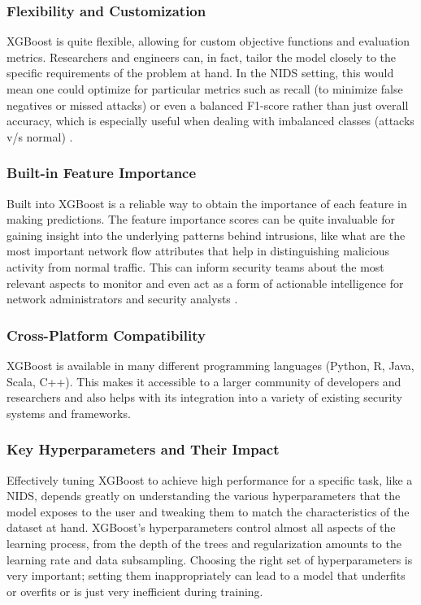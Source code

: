 \subsubsection{Flexibility and Customization} 
XGBoost is quite flexible, allowing for custom objective functions and evaluation metrics. Researchers and engineers can, in fact, tailor the model closely to the specific requirements of the problem at hand. In the NIDS setting, this would mean one could optimize for particular metrics such as recall (to minimize false negatives or missed attacks) or even a balanced F1-score rather than just overall accuracy, which is especially useful when dealing with imbalanced classes (attacks v/s normal) \parencite{shafi2022comprehensive}.

\subsubsection{Built-in Feature Importance} 
Built into XGBoost is a reliable way to obtain the importance of each feature in making predictions. The feature importance scores can be quite invaluable for gaining insight into the underlying patterns behind intrusions, like what are the most important network flow attributes that help in distinguishing malicious activity from normal traffic. This can inform security teams about the most relevant aspects to monitor and even act as a form of actionable intelligence for network administrators and security analysts \parencite{almutairi2025intrusion}.

\subsubsection{Cross-Platform Compatibility} 
XGBoost is available in many different programming languages (Python, R, Java, Scala, C++). This makes it accessible to a larger community of developers and researchers and also helps with its integration into a variety of existing security systems and frameworks.

\subsubsection{Key Hyperparameters and Their Impact} 
Effectively tuning XGBoost to achieve high performance for a specific task, like a NIDS, depends greatly on understanding the various hyperparameters that the model exposes to the user and tweaking them to match the characteristics of the dataset at hand. XGBoost's hyperparameters control almost all aspects of the learning process, from the depth of the trees and regularization amounts to the learning rate and data subsampling. Choosing the right set of hyperparameters is very important; setting them inappropriately can lead to a model that underfits or overfits or is just very inefficient during training.

